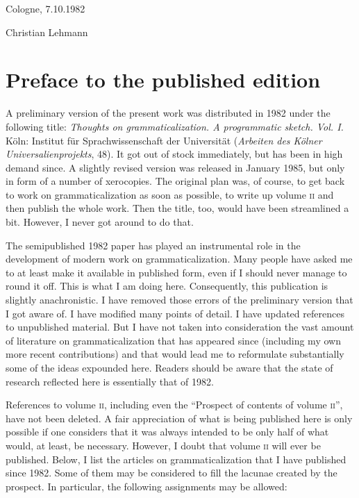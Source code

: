 \begin{refsection}
\vspace{\baselineskip}

\begin{minipage}{.45\linewidth}
\begin{flushleft}
Cologne, 7.10.1982
\end{flushleft}
\end{minipage}
\begin{minipage}{.45\linewidth}
\begin{flushright}
Christian Lehmann
\end{flushright}
\end{minipage}


\section{Preface to the published edition}

A preliminary version of the present work was distributed in 1982 under the following title: \textit{Thoughts on grammaticalization. A programmatic sketch. Vol. I.} Köln: Institut für Sprachwissenschaft der Universität (\textit{Arbeiten des Kölner Universalienprojekts}, 48). It got out of stock immediately, but has been in high demand since. A slightly revised version was released in January 1985, but only in form of a number of xerocopies. The original plan was, of course, to get back to work on grammaticalization as soon as possible, to write up volume \textsc{ii} and then publish the whole work. Then the title, too, would have been streamlined a bit. However, I never got around to do that.

The semipublished 1982 paper has played an instrumental role in the development of modern work on grammaticalization. Many people have asked me to at least make it available in published form, even if I should never manage to round it off. This is what I am doing here. Consequently, this publication is slightly anachronistic. I have removed those errors of the preliminary version that I got aware of. I have modified many points of detail. I have updated references to unpublished material. But I have not taken into consideration the vast amount of literature on grammaticalization that has appeared since (including my own more recent contributions) and that would lead me to reformulate substantially some of the ideas expounded here. Readers should be aware that the state of research reflected here is essentially that of 1982.

References to volume \textsc{ii}, including even the ``Prospect of contents of volume \textsc{ii}'', have not been deleted. A fair appreciation of what is being published here is only possible if one considers that it was always intended to be only half of what would, at least, be necessary. However, I doubt that volume \textsc{ii} will ever be published. Below, I list the articles on grammaticalization that I have published since 1982. Some of them may be considered to fill the lacunae created by the prospect. In particular, the following assignments may be allowed:


\end{refsection}
